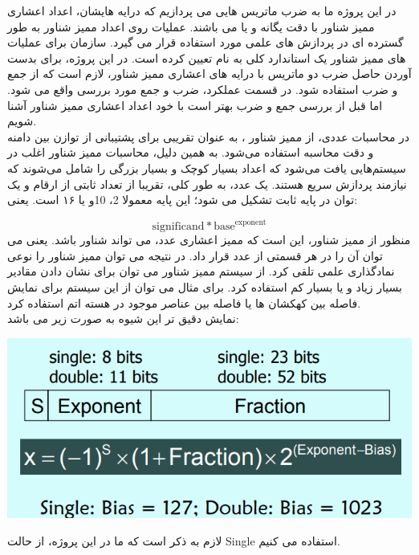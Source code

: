\documentclass[12pt,titlepage,a4page , tikz , multi,table , svgnames,xcdraw]{article}
\begin{document}
در این پروژه ما به ضرب ماتریس هایی می پردازیم که درایه هایشان، اعداد اعشاری ممیز شناور با دقت یگانه و یا 
 می باشند. عملیات روی اعداد ممیز شناور 
 به طور گسترده ای در پردازش های علمی مورد استفاده قرار می گیرد. سازمان 
 برای عملیات های ممیز شناور یک استاندارد کلی به نام 
 تعیین کرده است. در این پروژه، برای بدست آوردن حاصل ضرب دو ماتریس با درایه های اعشاری ممیز شناور، لازم است که از جمع و ضرب 
استفاده شود. در قسمت عملکرد، ضرب و جمع 
مورد بررسی واقع می شود. اما قبل از بررسی جمع و ضرب 
بهتر است با خود اعداد اعشاری ممیز شناور آشنا شویم. \\ 
در محاسبات عددی، از ممیز شناور ، به عنوان تقریبی برای پشتیبانی از توازن بین دامنه و دقت محاسبه استفاده می‌شود. به همین دلیل، محاسبات ممیز شناور اغلب در سیستم‌هایی یافت می‌شود که اعداد بسیار کوچک و بسیار بزرگی را شامل می‌شوند که نیازمند پردازش سریع هستند. یک عدد، به طور کلی، تقریبا از تعداد ثابتی از ارقام 
 و یک توان در پایه ثابت تشکیل می شود؛ این پایه معمولا 2، 10و یا ۱۶ است. یعنی: 

$$\text{significand} * \text{base}^{\text{exponent}}$$
منظور از ممیز شناور، این است که ممیز اعشاری عدد، می تواند شناور باشد. یعنی می توان آن را در هر قسمتی از عدد قرار داد. در نتیجه می توان ممیز شناور را نوعی نمادگذاری علمی تلقی کرد. از سیستم ممیز شناور می توان برای نشان دادن مقادیر بسیار زیاد و یا بسیار کم استفاده کرد. برای مثال می توان از این سیستم برای نمایش فاصله بین کهکشان ها یا فاصله بین عناصر موجود در هسته اتم استفاده کرد. \\
نمایش دقیق تر این شیوه به صورت زیر می باشد:

\begin{center}
\includegraphics[scale=0.8]
    {Images/Introduction/FP_overview.png}\\
\end{center}
لازم به ذکر است که ما در این پروژه، از حالت Single استفاده می کنیم. \\
\end{document}
